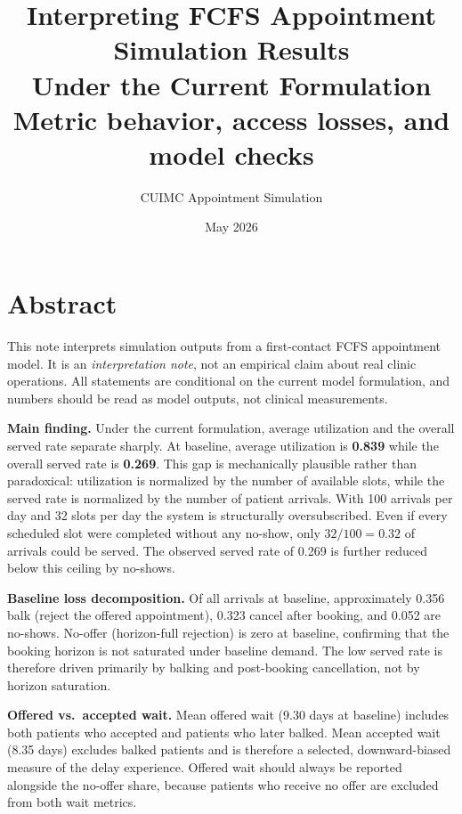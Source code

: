 \documentclass[11pt]{article}
\title{\textbf{Interpreting FCFS Appointment Simulation Results\\
       Under the Current Formulation}\\[4pt]
       \large Metric behavior, access losses, and model checks}
\author{CUIMC Appointment Simulation}
\date{May 2026}
\begin{document}
\maketitle
\tableofcontents
\newpage

\section{Abstract}

This note interprets simulation outputs from a first-contact FCFS
appointment model.  It is an \emph{interpretation note}, not an
empirical claim about real clinic operations.  All statements are
conditional on the current model formulation, and numbers should be
read as model outputs, not clinical measurements.

\medskip

\textbf{Main finding.}  Under the current formulation, average
utilization and the overall served rate separate sharply.  At
baseline, average utilization is \textbf{0.839} while the overall
served rate is \textbf{0.269}.  This gap is mechanically plausible
rather than paradoxical: utilization is normalized by the number of
available slots, while the served rate is normalized by the number of
patient arrivals.  With 100 arrivals per day and 32 slots per day the
system is structurally oversubscribed.  Even if every scheduled slot
were completed without any no-show, only $32/100 = 0.32$ of arrivals
could be served.  The observed served rate of 0.269 is further reduced
below this ceiling by no-shows.

\medskip

\textbf{Baseline loss decomposition.}
Of all arrivals at baseline, approximately 0.356 balk (reject the
offered appointment), 0.323 cancel after booking, and 0.052 are
no-shows.  No-offer (horizon-full rejection) is zero at baseline,
confirming that the booking horizon is not saturated under baseline
demand.  The low served rate is therefore driven primarily by balking
and post-booking cancellation, not by horizon saturation.

\medskip

\textbf{Offered vs.\ accepted wait.}
Mean offered wait (9.30 days at baseline) includes both patients who
accepted and patients who later balked.  Mean accepted wait (8.35
days) excludes balked patients and is therefore a selected,
downward-biased measure of the delay experience.  Offered wait should
always be reported alongside the no-offer share, because patients who
receive no offer are excluded from both wait metrics.
\end{document}
